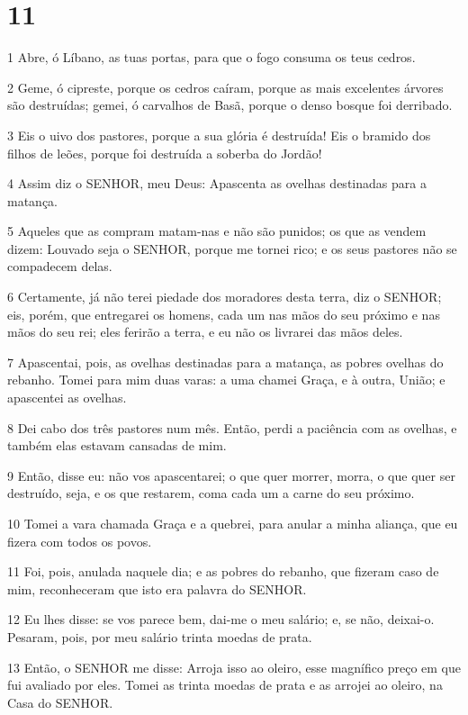 \chapter{11}

\par 1 Abre, ó Líbano, as tuas portas, para que o fogo consuma os teus cedros.
\par 2 Geme, ó cipreste, porque os cedros caíram, porque as mais excelentes árvores são destruídas; gemei, ó carvalhos de Basã, porque o denso bosque foi derribado.
\par 3 Eis o uivo dos pastores, porque a sua glória é destruída! Eis o bramido dos filhos de leões, porque foi destruída a soberba do Jordão!
\par 4 Assim diz o SENHOR, meu Deus: Apascenta as ovelhas destinadas para a matança.
\par 5 Aqueles que as compram matam-nas e não são punidos; os que as vendem dizem: Louvado seja o SENHOR, porque me tornei rico; e os seus pastores não se compadecem delas.
\par 6 Certamente, já não terei piedade dos moradores desta terra, diz o SENHOR; eis, porém, que entregarei os homens, cada um nas mãos do seu próximo e nas mãos do seu rei; eles ferirão a terra, e eu não os livrarei das mãos deles.
\par 7 Apascentai, pois, as ovelhas destinadas para a matança, as pobres ovelhas do rebanho. Tomei para mim duas varas: a uma chamei Graça, e à outra, União; e apascentei as ovelhas.
\par 8 Dei cabo dos três pastores num mês. Então, perdi a paciência com as ovelhas, e também elas estavam cansadas de mim.
\par 9 Então, disse eu: não vos apascentarei; o que quer morrer, morra, o que quer ser destruído, seja, e os que restarem, coma cada um a carne do seu próximo.
\par 10 Tomei a vara chamada Graça e a quebrei, para anular a minha aliança, que eu fizera com todos os povos.
\par 11 Foi, pois, anulada naquele dia; e as pobres do rebanho, que fizeram caso de mim, reconheceram que isto era palavra do SENHOR.
\par 12 Eu lhes disse: se vos parece bem, dai-me o meu salário; e, se não, deixai-o. Pesaram, pois, por meu salário trinta moedas de prata.
\par 13 Então, o SENHOR me disse: Arroja isso ao oleiro, esse magnífico preço em que fui avaliado por eles. Tomei as trinta moedas de prata e as arrojei ao oleiro, na Casa do SENHOR.
